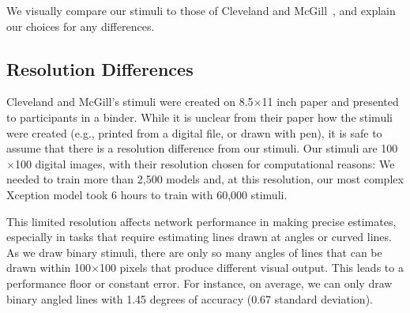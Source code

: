 \documentclass[journal]{vgtc}        %
\newcommand{\change}[1]{{#1}}
\begin{document}
\change{
We visually compare our stimuli to those of Cleveland and McGill~\cite{cleveland_mcgill}, and explain our choices for any differences.
}

\subsection{Resolution Differences}

\change{
Cleveland and McGill's stimuli were created on 8.5$\times$11 inch paper and presented to participants in a binder. While it is unclear from their paper how the stimuli were created (e.g., printed from a digital file, or drawn with pen), it is safe to assume that there is a resolution difference from our stimuli. Our stimuli are 100$\times$100 digital images, with their resolution chosen for computational reasons: We needed to train more than 2,500 models and, at this resolution, our most complex Xception model took 6 hours to train with 60,000 stimuli.

This limited resolution affects network performance in making precise estimates, especially in tasks that require estimating lines drawn at angles or curved lines. As we draw binary stimuli, there are only so many angles of lines that can be drawn within 100$\times$100 pixels that produce different visual output. This leads to a performance floor or constant error. For instance, on average, we can only draw binary angled lines with 1.45 degrees of accuracy (0.67 standard deviation).

}

\end{document}

